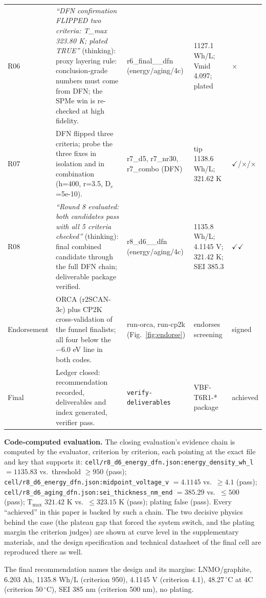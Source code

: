 \begin{longtable}{p{0.95cm}p{4.7cm}p{2.1cm}p{2.2cm}p{1.1cm}}
R06 & \emph{``DFN confirmation FLIPPED two criteria: T\_max 323.80 K; plated TRUE''} (thinking): proxy layering rule: conclusion-grade numbers must come from DFN; the SPMe win is re-checked at high fidelity. & r6\_final\_\_dfn (energy/aging/4c) & 1127.1 Wh/L; Vmid 4.097; plated & $\times$ \\
R07 & DFN flipped three criteria; probe the three fixes in isolation and in combination (h=400, r=3.5, D$_e$=5e-10). & r7\_d5, r7\_nr30, r7\_combo (DFN) & tip 1138.6 Wh/L; 321.62 K & $\checkmark$/$\times$/$\times$ \\
R08 & \emph{``Round 8 evaluated: both candidates pass with all 5 criteria checked''} (thinking): final combined candidate through the full DFN chain; deliverable package verified. & r8\_d6\_\_dfn (energy/aging/4c) & 1135.8 Wh/L; 4.1145 V; 321.42 K; SEI 385.3 & $\checkmark\checkmark$ \\
Endorsement & ORCA (r2SCAN-3c) plus CP2K cross-validation of the funnel finalists; all four below the $-6.0$ eV line in both codes. & run-orca, run-cp2k (Fig.~\ref{fig:endorse}) & endorses screening & signed \\
Final & Ledger closed: recommendation recorded, deliverables and index generated, verifier pass. & \texttt{verify-}\allowbreak\texttt{deliverables} & VBF-T6R1-* package & achieved \\
\bottomrule
\end{longtable}


\textbf{Code-computed evaluation.} The closing evaluation's evidence chain is
computed by the evaluator, criterion by criterion, each pointing at
the exact file and key that supports it: \texttt{cell/r8\_d6\_energy\_dfn.json:energy\_density\_wh\_l} $= 1135.83$ vs.\ threshold $\geq 950$
(pass); \texttt{cell/r8\_d6\_energy\_dfn.json:midpoint\_voltage\_v} $= 4.1145$ vs.\ $\geq 4.1$ (pass);
\texttt{cell/r8\_d6\_aging\_dfn.json:sei\_thickness\_nm\_end} $= 385.29$ vs.\
$\leq 500$ (pass); T$_{\max}$ $321.42$ K vs.\ $\leq 323.15$ K (pass); plating
false (pass). Every ``achieved'' in this paper is backed by such a chain.
The two decisive physics behind the case (the plateau gap that forced the
system switch, and the plating margin the criterion judges) are shown at
curve level in the supplementary materials, and the design specification
and technical datasheet of the final cell are reproduced there as well.

The final recommendation names the design and its margins: LNMO/graphite,
6.203 Ah, 1135.8 Wh/L (criterion 950), 4.1145 V (criterion 4.1),
48.27$\,^\circ$C at 4C (criterion 50$\,^\circ$C), SEI 385 nm (criterion
500 nm), no plating.

